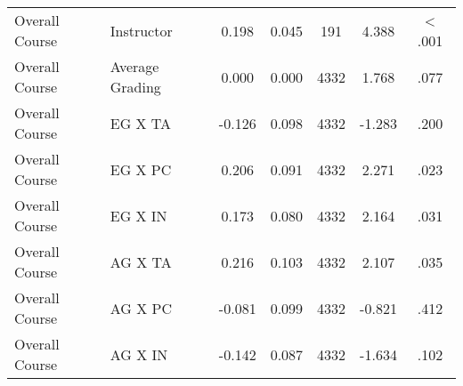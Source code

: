\documentclass[man]{apa6}
\theoremstyle{definition}
\theoremstyle{definition}
\theoremstyle{definition}
\theoremstyle{remark}
\begin{document}
\begin{table}[tbp]
\begin{center}
\begin{threeparttable}
\begin{tabular}{llccccc}
Overall Course & Instructor & 0.198 & 0.045 & 191 & 4.388 & < .001\\
Overall Course & Average Grading & 0.000 & 0.000 & 4332 & 1.768 & .077\\
Overall Course & EG X TA & -0.126 & 0.098 & 4332 & -1.283 & .200\\
Overall Course & EG X PC & 0.206 & 0.091 & 4332 & 2.271 & .023\\
Overall Course & EG X IN & 0.173 & 0.080 & 4332 & 2.164 & .031\\
Overall Course & AG X TA & 0.216 & 0.103 & 4332 & 2.107 & .035\\
Overall Course & AG X PC & -0.081 & 0.099 & 4332 & -0.821 & .412\\
Overall Course & AG X IN & -0.142 & 0.087 & 4332 & -1.634 & .102\\
\bottomrule
\end{tabular}
\end{threeparttable}
\end{center}
\end{table}
\end{document}
